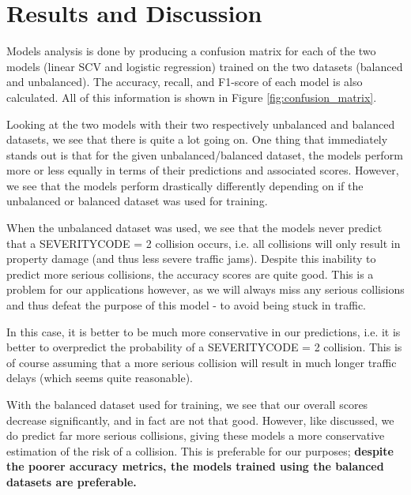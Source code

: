\documentclass[12pt,a4paper,oneside]{article}
\begin{document}
\section{Results and Discussion}

Models analysis is done by producing a confusion matrix for each of the two models (linear SCV and logistic regression) trained on the two datasets (balanced and unbalanced).
The accuracy, recall, and F1-score of each model is also calculated.
All of this information is shown in Figure \ref{fig:confusion_matrix}.

Looking at the two models with their two respectively unbalanced and balanced datasets, we see that there is quite a lot going on. 
One thing that immediately stands out is that for the given unbalanced/balanced dataset, the models perform more or less equally in terms of their predictions and associated scores. 
However, we see that the models perform drastically differently depending on if the unbalanced or balanced dataset was used for training. 

When the unbalanced dataset was used, we see that the models never predict that a SEVERITYCODE = 2 collision occurs, i.e. all collisions will only result in property damage (and thus less severe traffic jams). 
Despite this inability to predict more serious collisions, the accuracy scores are quite good. 
This is a problem for our applications however, as we will always miss any serious collisions and thus defeat the purpose of this model - to avoid being stuck in traffic. 

In this case, it is better to be much more conservative in our predictions, i.e. it is better to overpredict the probability of a SEVERITYCODE = 2 collision. 
This is of course assuming that a more serious collision will result in much longer traffic delays (which seems quite reasonable). 

With the balanced dataset used for training, we see that our overall scores decrease significantly, and in fact are not that good. 
However, like discussed, we do predict far more serious collisions, giving these models a more conservative estimation of the risk of a collision. 
This is preferable for our purposes; \textbf{despite the poorer accuracy metrics, the models trained using the balanced datasets are preferable.}
\end{document}
